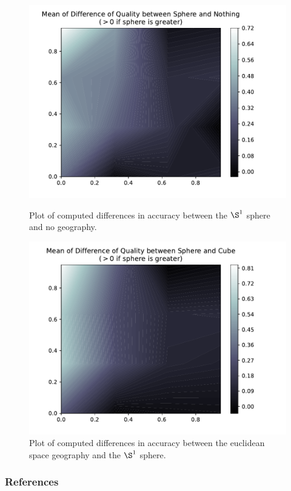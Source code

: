 \documentclass[ratio=169]{beamercours}
\begin{document}
\begin{frame}[allowframebreaks]
	\begin{figure}[H]
	\centering
	\hfill
	\begin{minipage}{.45\textwidth}
		\includegraphics[width=\linewidth]{../Figures/qual_diff_sphere_none}
		\caption{Plot of computed differences in accuracy between the $\S^{1}$ sphere and no geography.}
	\label{nonesphere}
	\end{minipage}
	\hfill
	\begin{minipage}{.45\textwidth}
		\includegraphics[width=\linewidth]{../Figures/qual_diff_sphere_cube}
	\caption{Plot of computed differences in accuracy between the euclidean space geography and the $\S^{1}$ sphere.}
	\label{cubesphere}
	\end{minipage}
	\hfill
	\end{figure}

\end{frame}

\begin{frame}[t]
	\frametitle{References}
	
	
\end{frame}
\end{document}
